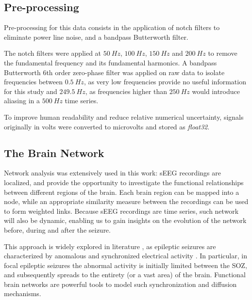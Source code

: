 \subsection{Pre-processing}

Pre-processing for this data consists in the application of notch filters to 
eliminate power line noise, and a bandpass Butterworth filter.

The notch filters were applied at $50\ Hz$, $100\ Hz$, $150\ Hz$ and $200\ Hz$
to remove the fundamental frequency and its fundamental harmonics.
A bandpass Butterworth 6th order zero-phase filter was applied on raw data to
isolate frequencies between $0.5\ Hz$, as very low frequencies
provide no useful information for this study \cite{eeg-book} and $249.5\ Hz$,
as frequencies higher than $250\ Hz$ would introduce aliasing in a $500\ Hz$ 
time series.

To improve human readability and reduce relative numerical uncertainty, signals
originally in volts were converted to microvolts and stored as \textit{float32}.


\subsection{The Brain Network} \label{meth:thebrainnetwork}

Network analysis was extensively used in this work: sEEG recordings are
localized, and provide the opportunity to investigate the functional
relationships between different regions of the brain.
Each brain region can be mapped into a node, while an appropriate similarity
measure between the recordings can be used to form weighted links.
Because sEEG recordings are time series, such network will also be dynamic,
enabling us to gain insights on the evolution of the network before, during and
after the seizure.

This approach is widely explored in literature \cite{eeg-book}, as epileptic
seizures are characterized by anomalous and synchronized electrical activity
\cite{WHO2016Epilepsy}.
In particular, in focal epileptic seizures the abnormal activity is initially
limited between the SOZ, and subsequently spreads to the entirety (or a vast
area) of the brain.
Functional brain networks are powerful tools to model such synchronization and
diffusion mechanisms.

